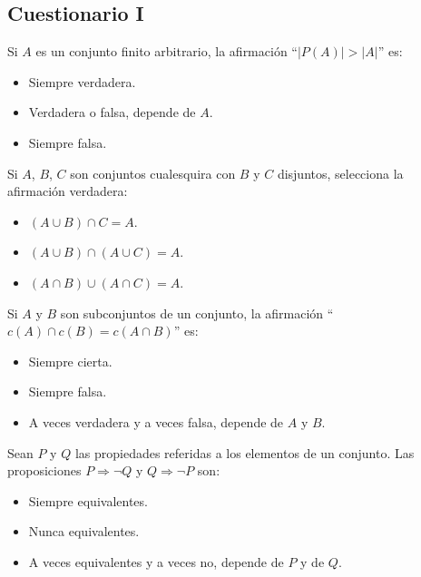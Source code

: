 \subsection{Cuestionario I}
\begin{ejercicio}
    Si $A$ es un conjunto finito arbitrario, la afirmación ``$|P(A)| > |A|$'' es:
    \begin{itemize}
        \item Siempre verdadera.
        \item Verdadera o falsa, depende de $A$.
        \item Siempre falsa.
    \end{itemize}
\end{ejercicio}

\begin{ejercicio}
    Si $A$, $B$, $C$ son conjuntos cualesquira con $B$ y $C$ disjuntos, selecciona la afirmación verdadera:
    \begin{itemize}
        \item $(A \cup B)\cap C = A$.
        \item $(A \cup B)\cap (A \cup C)=A$.
        \item $(A\cap B)\cup(A \cap C)=A$.
    \end{itemize}
\end{ejercicio}

\begin{ejercicio}
    Si $A$ y $B$ son subconjuntos de un conjunto, la afirmación \newline ``$c(A) \cap c(B) = c(A \cap B)$'' es:
    \begin{itemize}
        \item Siempre cierta.
        \item Siempre falsa.
        \item A veces verdadera y a veces falsa, depende de $A$ y $B$.
    \end{itemize}
\end{ejercicio}

\begin{ejercicio}
    Sean $P$ y $Q$ las propiedades referidas a los elementos de un conjunto. Las proposiciones $P \Rightarrow \neg Q$ y $Q \Rightarrow \neg P$ son:
    \begin{itemize}
        \item Siempre equivalentes.
        \item Nunca equivalentes.
        \item A veces equivalentes y a veces no, depende de $P$ y de $Q$.
    \end{itemize}
\end{ejercicio}

